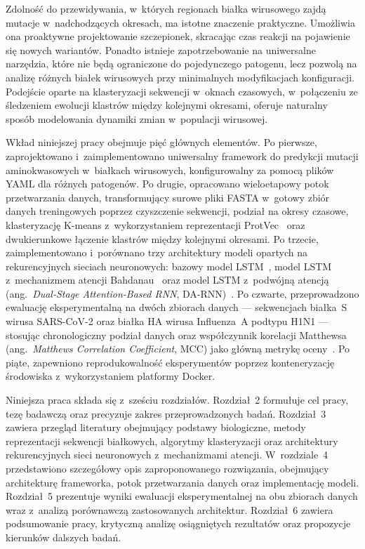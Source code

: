 Zdolność do przewidywania, w~których regionach białka wirusowego zajdą mutacje w~nadchodzących okresach, ma istotne znaczenie praktyczne. Umożliwia ona proaktywne projektowanie szczepionek, skracając czas reakcji na pojawienie się nowych wariantów. Ponadto istnieje zapotrzebowanie na uniwersalne narzędzia, które nie będą ograniczone do pojedynczego patogenu, lecz pozwolą na analizę różnych białek wirusowych przy minimalnych modyfikacjach konfiguracji. Podejście oparte na klasteryzacji sekwencji w~oknach czasowych, w~połączeniu ze śledzeniem ewolucji klastrów między kolejnymi okresami, oferuje naturalny sposób modelowania dynamiki zmian w~populacji wirusowej.

Wkład niniejszej pracy obejmuje pięć głównych elementów. Po pierwsze, zaprojektowano i~zaimplementowano uniwersalny framework do predykcji mutacji aminokwasowych w~białkach wirusowych, konfigurowalny za pomocą plików YAML dla różnych patogenów. Po drugie, opracowano wieloetapowy potok przetwarzania danych, transformujący surowe pliki FASTA w~gotowy zbiór danych treningowych poprzez czyszczenie sekwencji, podział na okresy czasowe, klasteryzację K-means z~wykorzystaniem reprezentacji ProtVec~\cite{asgari2015protvec} oraz dwukierunkowe łączenie klastrów między kolejnymi okresami. Po trzecie, zaimplementowano i~porównano trzy architektury modeli opartych na rekurencyjnych sieciach neuronowych: bazowy model LSTM~\cite{hochreiter1997lstm}, model LSTM z~mechanizmem atencji Bahdanau~\cite{bahdanau2015attention} oraz model LSTM z~podwójną atencją (ang.~\textit{Dual-Stage Attention-Based RNN}, DA-RNN)~\cite{qin2017darnn}. Po czwarte, przeprowadzono ewaluację eksperymentalną na dwóch zbiorach danych --- sekwencjach białka~S wirusa SARS-CoV-2 oraz białka HA wirusa Influenza~A podtypu H1N1 --- stosując chronologiczny podział danych oraz współczynnik korelacji Matthewsa (ang.~\textit{Matthews Correlation Coefficient}, MCC) jako główną metrykę oceny~\cite{chicco2020mcc}. Po piąte, zapewniono reprodukowalność eksperymentów poprzez konteneryzację środowiska z~wykorzystaniem platformy Docker.

Niniejsza praca składa się z~sześciu rozdziałów. Rozdział~2 formułuje cel pracy, tezę badawczą oraz precyzuje zakres przeprowadzonych badań. Rozdział~3 zawiera przegląd literatury obejmujący podstawy biologiczne, metody reprezentacji sekwencji białkowych, algorytmy klasteryzacji oraz architektury rekurencyjnych sieci neuronowych z~mechanizmami atencji. W~rozdziale~4 przedstawiono szczegółowy opis zaproponowanego rozwiązania, obejmujący architekturę frameworka, potok przetwarzania danych oraz implementację modeli. Rozdział~5 prezentuje wyniki ewaluacji eksperymentalnej na obu zbiorach danych wraz z~analizą porównawczą zastosowanych architektur. Rozdział~6 zawiera podsumowanie pracy, krytyczną analizę osiągniętych rezultatów oraz propozycje kierunków dalszych badań.
